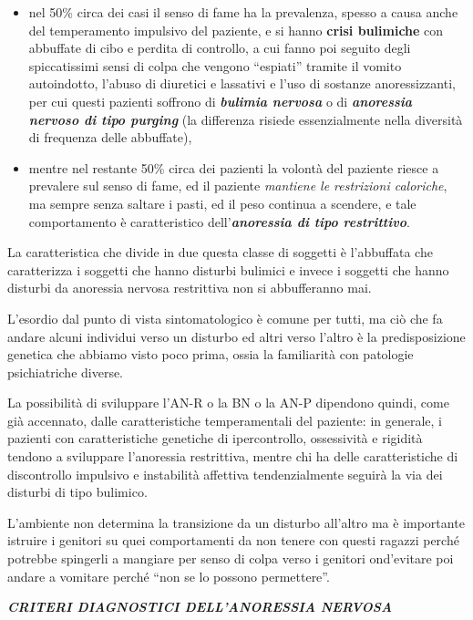 \documentclass[]{article}
\begin{document}
\begin{itemize}
\item
  nel 50\% circa dei casi il senso di fame ha la prevalenza, spesso a
  causa anche del temperamento impulsivo del paziente, e si hanno
  \textbf{crisi bulimiche} con abbuffate di cibo e perdita di controllo,
  a cui fanno poi seguito degli spiccatissimi sensi di colpa che vengono
  ``espiati'' tramite il vomito autoindotto, l'abuso di diuretici e
  lassativi e l'uso di sostanze anoressizzanti, per cui questi pazienti
  soffrono di \textbf{\emph{bulimia nervosa}} o di
  \textbf{\emph{anoressia nervoso di tipo purging}} (la differenza
  risiede essenzialmente nella diversità di frequenza delle abbuffate),
\item
  mentre nel restante 50\% circa dei pazienti la volontà del paziente
  riesce a prevalere sul senso di fame, ed il paziente \emph{mantiene le
  restrizioni caloriche}, ma sempre senza saltare i pasti, ed il peso
  continua a scendere, e tale comportamento è caratteristico
  dell'\textbf{\emph{anoressia di tipo restrittivo}}.
\end{itemize}

La caratteristica che divide in due questa classe di soggetti è
l'abbuffata che caratterizza i soggetti che hanno disturbi bulimici e
invece i soggetti che hanno disturbi da anoressia nervosa restrittiva
non si abbufferanno mai.

L'esordio dal punto di vista sintomatologico è comune per tutti, ma ciò
che fa andare alcuni individui verso un disturbo ed altri verso l'altro
è la predisposizione genetica che abbiamo visto poco prima, ossia la
familiarità con patologie psichiatriche diverse.

La possibilità di sviluppare l'AN-R o la BN o la AN-P dipendono quindi,
come già accennato, dalle caratteristiche temperamentali del paziente:
in generale, i pazienti con caratteristiche genetiche di ipercontrollo,
ossessività e rigidità tendono a sviluppare l'anoressia restrittiva,
mentre chi ha delle caratteristiche di discontrollo impulsivo e
instabilità affettiva tendenzialmente seguirà la via dei disturbi di
tipo bulimico.

L'ambiente non determina la transizione da un disturbo all'altro ma è
importante istruire i genitori su quei comportamenti da non tenere con
questi ragazzi perché potrebbe spingerli a mangiare per senso di colpa
verso i genitori ond'evitare poi andare a vomitare perché ``non se lo
possono permettere''.

\textbf{\emph{CRITERI DIAGNOSTICI DELL'ANORESSIA NERVOSA}}
\end{document}
